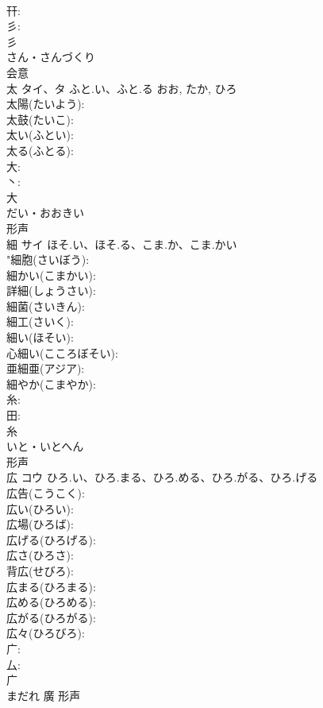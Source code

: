 \documentclass[8pt]{extreport}
\begin{document}
\begin{CJK}{UTF8}{min}
\\	幵: 
\\	彡: 
\\	彡	
\\	さん・さんづくり	
\\	会意 
\\	太	タイ、タ	ふと.い、ふと.る	おお, たか, ひろ	
\\	太陽(たいよう): 
\\	太鼓(たいこ): 
\\	太い(ふとい): 
\\	太る(ふとる): 
\\	大: 
\\	丶: 
\\	大	
\\	だい・おおきい	
\\	形声 
\\	細	サイ	ほそ.い、ほそ.る、こま.か、こま.かい		
\\	"細胞(さいぼう): 
\\	細かい(こまかい): 
\\	詳細(しょうさい): 
\\	細菌(さいきん): 
\\	細工(さいく): 
\\	細い(ほそい): 
\\	心細い(こころぼそい): 
\\	亜細亜(アジア): 
\\	細やか(こまやか): 
\\	糸: 
\\	田: 
\\	糸	
\\	いと・いとへん	
\\	形声 
\\	広	コウ	ひろ.い、ひろ.まる、ひろ.める、ひろ.がる、ひろ.げる		
\\	広告(こうこく): 
\\	広い(ひろい): 
\\	広場(ひろば): 
\\	広げる(ひろげる): 
\\	広さ(ひろさ): 
\\	背広(せびろ): 
\\	広まる(ひろまる): 
\\	広める(ひろめる): 
\\	広がる(ひろがる): 
\\	広々(ひろびろ): 
\\	广: 
\\	厶: 
\\	广	
\\	まだれ	廣	形声 

\end{CJK}
\end{document}

